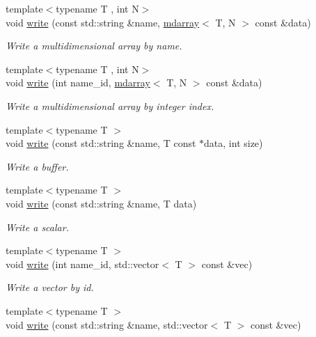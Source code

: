 \begin{DoxyCompactItemize}
\item 
{\footnotesize template$<$typename T , int N$>$ }\\void \hyperlink{classsirius_1_1_h_d_f5__tree_ac1f972a1a64cef44a23f08a77ba5f5b5}{write} (const std\+::string \&name, \hyperlink{classsddk_1_1mdarray}{mdarray}$<$ T, N $>$ const \&data)
\begin{DoxyCompactList}\small\item\em Write a multidimensional array by name. \end{DoxyCompactList}\item 
{\footnotesize template$<$typename T , int N$>$ }\\void \hyperlink{classsirius_1_1_h_d_f5__tree_acbdec86b47ae63233e30e7ed2ad4217e}{write} (int name\+\_\+id, \hyperlink{classsddk_1_1mdarray}{mdarray}$<$ T, N $>$ const \&data)
\begin{DoxyCompactList}\small\item\em Write a multidimensional array by integer index. \end{DoxyCompactList}\item 
{\footnotesize template$<$typename T $>$ }\\void \hyperlink{classsirius_1_1_h_d_f5__tree_ac1ce613af86edc0c121c30dffcff356f}{write} (const std\+::string \&name, T const $\ast$data, int size)
\begin{DoxyCompactList}\small\item\em Write a buffer. \end{DoxyCompactList}\item 
{\footnotesize template$<$typename T $>$ }\\void \hyperlink{classsirius_1_1_h_d_f5__tree_a0ec9065bbe05604f5d615fdb8273bf94}{write} (const std\+::string \&name, T data)
\begin{DoxyCompactList}\small\item\em Write a scalar. \end{DoxyCompactList}\item 
{\footnotesize template$<$typename T $>$ }\\void \hyperlink{classsirius_1_1_h_d_f5__tree_a9418c15d73e54dd4567f9971e3b8ce7a}{write} (int name\+\_\+id, std\+::vector$<$ T $>$ const \&vec)
\begin{DoxyCompactList}\small\item\em Write a vector by id. \end{DoxyCompactList}\item 
{\footnotesize template$<$typename T $>$ }\\void \hyperlink{classsirius_1_1_h_d_f5__tree_af41df323859d1a23d9e42420c38cad84}{write} (const std\+::string \&name, std\+::vector$<$ T $>$ const \&vec)

\end{DoxyCompactItemize}

